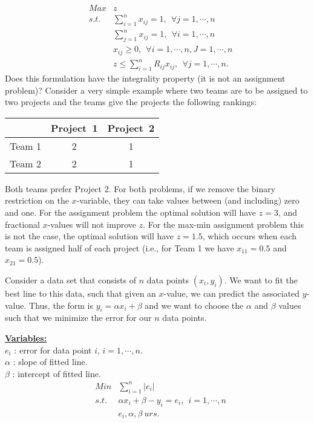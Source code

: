  \\
\begin{eqnarray}
& Max  & z  \nonumber \\
& s.t. & \sum_{i=1}^{n} x_{ij} = 1,~~ \forall j = 1,\cdots,n \nonumber \\
&      & \sum_{j=1}^{n} x_{ij} = 1,~~ \forall i = 1,\cdots,n \nonumber \\
&      & x_{ij} \ge 0,~~ \forall i = 1,\cdots,n, J = 1,\cdots,n \nonumber \\
&      & z \le \sum_{i=1}^{n} R_{ij} x_{ij},~~ \forall j = 1,\cdots,n. \nonumber
\end{eqnarray}
Does this formulation have the integrality property (it is not an assignment problem)?  Consider a very simple example where two teams are to be assigned to two projects and the teams give the projects the following rankings:
\begin{table}[h!] \begin{center} \begin{tabular} {|c||c|c|}
\hline           & Project~1 & Project~2 \\ \hline \hline
\hline Team 1    & 2  & 1  \\
\hline Team 2    & 2  & 1 \\ \hline
\end{tabular} \end{center} \end{table}
Both teams prefer Project 2.  For both problems, if we remove the binary restriction on the
$x$-variable, they can take values between (and including) zero and one. For the assignment problem the optimal solution will have $z=3$, and fractional $x$-values will not improve $z$. For the max-min assignment problem this is not the case, the optimal solution will have $z=1.5$, which occurs when each team is assigned half of each project (i.e., for Team 1 we have $x_{11} = 0.5$ and $x_{21} = 0.5$).


\newpage {} Consider a data set that consists of $n$ data points $(x_i,y_i)$.  We want to fit the best line to this data, such that given an $x$-value, we can predict the associated $y$-value.  Thus, the form is $y_ i = \alpha x_i + \beta$ and we want to choose the $\alpha$ and $\beta$ values such that we minimize the error for our $n$ data points.

\smallskip  \underline{\bf Variables:}\\
$e_i$ : error for data point $i$, $i = 1,\cdots,n$. \\
$\alpha$ : slope of fitted line. \\
$\beta$ : intercept of fitted line.
\begin{eqnarray}
& Min   & \sum_{i=1}^n |e_i|  \nonumber \\
& s.t.  & \alpha x_i + \beta - y_i = e_i,~~ i=1,\cdots,n \nonumber \\
&       & e_i, \alpha, \beta ~ urs \nonumber.
\end{eqnarray}

